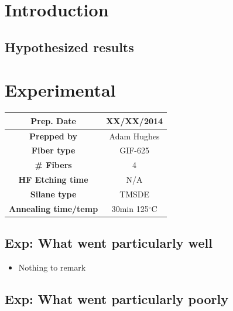 \documentclass{article}
\begin{document}
\newpage

\tableofcontents

\newpage

\hypertarget{intro}{\section{Introduction}}


\subsection{Hypothesized results}

\hypertarget{exp}{\section{Experimental}}

\begin{center}
\begin{tabular}{| c | c |}
 \hline
 {\bf Prep. Date} & XX/XX/2014 \\ \hline
 {\bf Prepped by} & Adam Hughes \\ \hline

 {\bf Fiber type} & GIF-625 \\ \hline
 {\bf \# Fibers} & 4  \\ \hline
 {\bf HF Etching time} & N/A \\ \hline
 {\bf Silane type} & TMSDE \\ \hline
 {\bf Annealing time/temp} & 30min 125$^\circ$C  \\ \hline
\end{tabular}
\end{center}

\vspace{.3cm}


\subsection{Exp: {\color{blue} What went particularly well}}

\begin{itemize}
\item{Nothing to remark}
\end{itemize}

\subsection{Exp: {\color{red} What went particularly poorly}}
\end{document}
